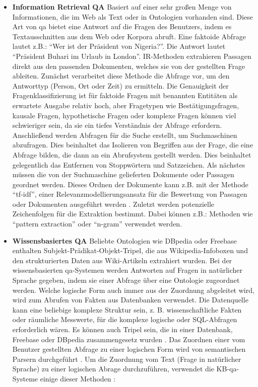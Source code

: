 \documentclass[
        ngerman,
        paper=a4,
        numbers=noendperiod,
]{scrreprt}
\begin{document}
\begin{itemize}
    \item \textbf{Information Retrieval QA} Basiert auf einer sehr großen Menge von Informationen, die im Web als Text oder in Ontologien vorhanden sind. Diese Art von \ac{qa} bietet eine Antwort auf die Fragen des Benutzers, indem es Textausschnitten aus dem Web oder Korpora abruft. Eine faktoide Abfrage lautet z.B.: \enquote{Wer ist der Präsident von Nigeria?}. Die Antwort lautet \enquote{Präsident Buhari im Urlaub in London}. IR-Methoden extrahieren Passagen direkt aus den passenden Dokumenten, welches sie von der gestellten Frage ableiten. Zunächst verarbeitet diese Methode die Abfrage vor, um den Antworttyp (Person, Ort oder Zeit) zu ermitteln. Die Genauigkeit der Fragenklassifizierung ist für faktoide Fragen mit benannten Entitäten als erwartete Ausgabe relativ hoch, aber Fragetypen wie Bestätigungsfragen, kausale Fragen, hypothetische Fragen oder komplexe Fragen können viel schwieriger sein, da sie ein tiefes Verständnis der Abfrage erfordern. Anschließend werden Abfragen für die Suche erstellt, um Suchmaschinen abzufragen. Dies beinhaltet das Isolieren von Begriffen aus der Frage, die eine Abfrage bilden, die dann an ein Abrufsystem gestellt werden. Dies beinhaltet gelegentlich das Entfernen von Stoppwörtern und Satzzeichen. Als nächstes müssen die von der Suchmaschine gelieferten Dokumente oder Passagen geordnet werden. Dieses Ordnen der Dokumente kann z.B. mit der Methode \enquote{tf-idf}, einer Relevanzmodellierungsansatz für die Bewertung von Passagen oder Dokumenten ausgeführt werden \citep[S. 467 - 470]{Jurafsky2014SpeechProcessing}.
    Zuletzt werden potenzielle Zeichenfolgen für die Extraktion bestimmt. Dabei können z.B.: Methoden wie \enquote{pattern extraction} \citep{soubbotin2001patterns} oder \enquote{n-gram} \citep{brill2001data} verwendet werden.
    \item \textbf{Wissensbasiertes QA} Beliebte Ontologien wie DBpedia \citep{bizer2009dbpedia} oder Freebase \citep{bollacker2008freebase} enthalten Subjekt-Prädikat-Objekt-Tripel, die aus Wikipedia-Infoboxen und den strukturierten Daten aus Wiki-Artikeln extrahiert wurden. Bei der wissensbasierten \ac{qa}-Systemen werden Antworten auf Fragen in natürlicher Sprache gegeben, indem sie einer Abfrage über eine Ontologie zugeordnet werden. Welche logische Form auch immer aus der Zuordnung abgeleitet wird, wird zum Abrufen von Fakten aus Datenbanken verwendet. Die Datenquelle kann eine beliebige komplexe Struktur sein, z. B. wissenschaftliche Fakten oder räumliche Messwerte, für die komplexe logische oder SQL-Abfragen erforderlich wären. Es können auch Tripel sein, die in einer Datenbank, Freebase oder DBpedia zusammengesetz wurden \citep[S. 476]{Jurafsky2014SpeechProcessing}. Das Zuordnen einer vom Benutzer gestellten Abfrage zu einer logischen Form wird von semantischen Parsern durchgeführt \citep{hoffner2017survey}. Um die Zuordnung vom Text (Frage in natürlicher Sprache) zu einer logischen Abrage durchzuführen, verwendet die KB-\ac{qa}-Systeme einige dieser Methoden \citep[S. 477 - 479]{Jurafsky2014SpeechProcessing}: 

\end{itemize}
\end{document}
